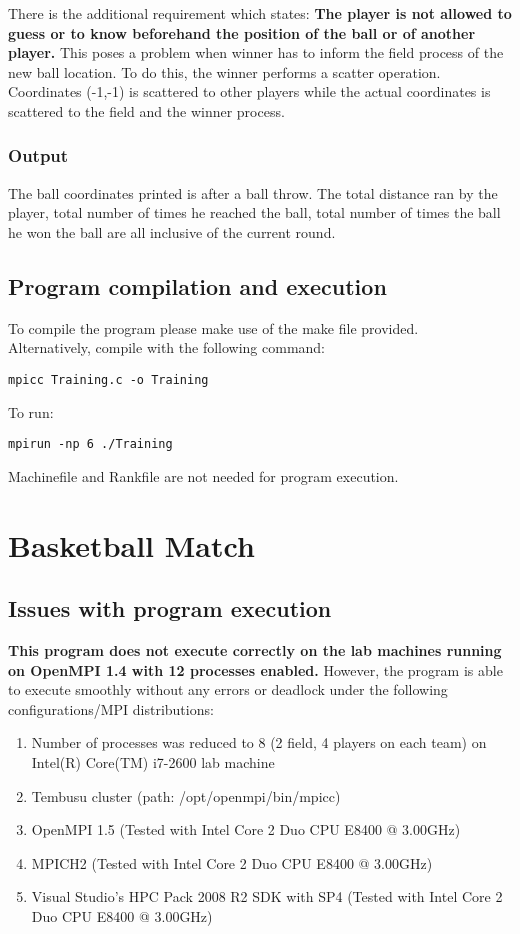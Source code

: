 \documentclass{article}
\begin{document}
There is the additional requirement which states: \textbf{The player is not allowed to guess or to know beforehand the position of the ball or of another player.}  This poses a problem when winner has to inform the field process of the new ball location. To do this, the winner performs a scatter operation. Coordinates (-1,-1) is scattered to other players while the actual coordinates is scattered to the field and the winner process.

\subsubsection{Output}
The ball coordinates printed is after a ball throw. 
The total distance ran by the player, total number of times he reached the ball, total number of times the ball he won the ball are all inclusive of the current round. 


\subsection{Program compilation and execution}
To compile the program please make use of the make file provided.\\
Alternatively, compile with the following command:
\begin{verbatim}
mpicc Training.c -o Training
\end{verbatim}
To run:
\begin{verbatim}
mpirun -np 6 ./Training
\end{verbatim}

Machinefile and Rankfile are not needed for program execution.
\pagebreak

\section{Basketball Match}

\subsection{Issues with program execution}
\textbf{This program does not execute correctly on the lab machines running on OpenMPI 1.4 with 12 processes enabled.} However, the program is able to execute smoothly without any errors or deadlock under the following configurations/MPI distributions:

\begin{enumerate}
\item Number of processes was reduced to 8 (2 field, 4 players on each team) on Intel(R) Core(TM) i7-2600 lab machine
\item Tembusu cluster (path: /opt/openmpi/bin/mpicc)
\item OpenMPI 1.5 (Tested with Intel Core 2 Duo CPU E8400 @ 3.00GHz)
\item MPICH2 (Tested with Intel Core 2 Duo CPU E8400 @ 3.00GHz)
\item Visual Studio’s HPC Pack 2008 R2 SDK with SP4 (Tested with Intel Core 2 Duo CPU E8400 @ 3.00GHz)
\end{enumerate}
\end{document}
